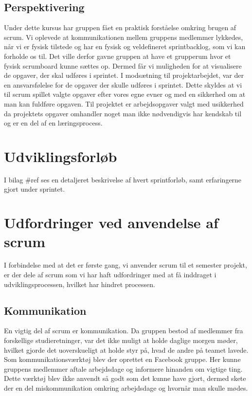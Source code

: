 \section{Perspektivering}
Under dette kursus har gruppen fået en praktisk forståelse omkring brugen af scrum. Vi oplevede at kommunikationen mellem gruppens medlemmer lykkedes, når vi er fysisk tilstede og har en fysisk og veldefineret sprintbacklog, som vi kan forholde os til. Det ville derfor gavne gruppen at have et grupperum hvor et fysisk scrumboard kunne sættes op. Dermed får vi muligheden for at visualisere de opgaver, der skal udføres i sprintet. \newline
I modsætning til projektarbejdet, var der en ansvarsfølelse for de opgaver der skulle udføres i sprintet. Dette skyldes at vi til scrum spillet valgte opgaver efter vores egne evner og med en sikkerhed om at man kan fuldføre opgaven. Til projektet er arbejdsopgaver valgt med usikkerhed da projektets opgaver omhandler noget man ikke nødvendigvis har kendskab til og er en del af en læringsprocess.

\chapter{Udviklingsforløb}
I bilag \#ref ses en detaljeret beskrivelse af hvert sprintforløb, samt erfaringerne gjort under sprintet.

\chapter{Udfordringer ved anvendelse af scrum}
I forbindelse med at det er første gang, vi anvender scrum til et semester projekt, er der dele af scrum som vi har haft udfordringer med at få inddraget i udviklingsprocessen, hvilket har hindret processen.

\section{Kommunikation}
En vigtig del af scrum er kommunikation. Da gruppen bestod af medlemmer fra forskellige studieretninger, var det ikke muligt at holde daglige morgen møder, hvilket gjorde det uoverskueligt at holde styr på, hvad de andre på teamet lavede. Som kommunikationsværktøj blev der oprettet en Facebook gruppe. Her kunne gruppens medlemmer aftale arbejdsdage og informere hinanden om vigtige ting. Dette værktøj blev ikke anvendt så godt som det kunne have gjort, dermed skete der en del miskommunikation omkring arbejdsdage og hvornår man skulle mødes. \par

